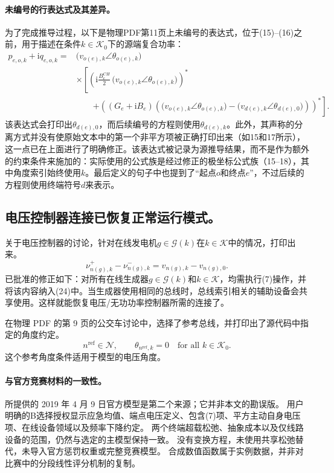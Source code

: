 \documentclass{article}
\begin{document}
\paragraph{未编号的行表达式及其差异。}
为了完成推导过程，以下是物理PDF第11页上未编号的表达式，位于(15)--(16)之前，用于描述在条件$k\in\mathcal K_0$下的源端复合功率：
\[
\begin{aligned}
p_{e,o,k}+\mathrm i q_{e,o,k}
={}&\bigl(v_{o(e),k}\angle\theta_{o(e),k}\bigr)\\
&\times\left[
\left(\mathrm i\frac{B_e^{CH}}2\,\bigl(v_{o(e),k}\angle\theta_{o(e),k}\bigr)\right)^*
\right.\\
&\qquad\left.+\left((G_e+\mathrm i B_e)
\left(\bigl(v_{o(e),k}\angle\theta_{o(e),k}\bigr)
-\bigl(v_{d(e),k}\angle\theta_{d(e),0}\bigr)\right)\right)^*
\right].
\end{aligned}
\]
该表达式会打印出$\theta_{d(e),0}$，而后续编号的方程则使用$\theta_{d(e),k}$。此外，其声称的分离方式并没有使原始文本中的第一个非平方项被正确打印出来（如15和17所示），这一点已在上面进行了明确修正。该表达式被记录为源推导结果，而不是作为额外的约束条件来施加的：实际使用的公式族是经过修正的极坐标公式族（15–18），其中角度索引始终使用$k$。最后定义的句子中也提到了“起点$o$和终点$e$”，不过后续的方程则使用终端符号$d$来表示。

\subsection*{电压控制器连接已恢复正常运行模式。}
关于电压控制器的讨论，针对在线发电机$g\in\mathcal G(k)$在$k\in\mathcal K$中的情况，打印出来。
\begin{equation}
\nu_{n(g),k}^{+}-\nu_{n(g),k}^{-}
=v_{n(g),k}-v_{n(g),0}.
\tag{7}
\end{equation}
已批准的修正如下：对所有在线生成器$g\in\mathcal G(k)$和$k\in\mathcal K$，均需执行(7)操作，并将该内容纳入(24)中。当生成器使用相同的总线时，总线索引相关的辅助设备会共享使用。这样就能恢复电压/无功功率控制器所需的连接了。

在物理 PDF 的第 9 页的公交车讨论中，选择了参考总线，并打印出了源代码中指定的角度约定。
\[
n^{\mathrm{ref}}\in\mathcal N,\qquad
\theta_{n^{\mathrm{ref}},k}=0\quad\text{for all }k\in\mathcal K_0.
\]
这个参考角度条件适用于模型的电压角度。

\paragraph{与官方竞赛材料的一致性。}
所提供的 2019 年 4 月 9 日官方模型是第二个来源；它并非本文的勘误版。 用户明确的B选择授权显示应急均值、端点电压定义、包含(7)项、平方主动自身电压项、在线设备领域以及频率下降约定。 两个终端超载松弛、抽象成本以及仅线路设备的范围，仍然与选定的主模型保持一致。 没有变换方程，未使用共享松弛替代，未导入官方惩罚权重或完整竞赛模型。 合成数值函数属于实例数据，并非对比赛中的分段线性评分机制的复制。
\end{document}

